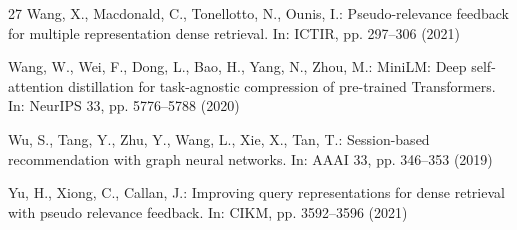 \documentclass[runningheads]{llncs}
\begin{document}
\begin{thebibliography}{27}
Wang, X., Macdonald, C., Tonellotto, N., Ounis, I.:
Pseudo-relevance feedback for multiple representation dense retrieval.
In: ICTIR, pp. 297--306 (2021)

Wang, W., Wei, F., Dong, L., Bao, H., Yang, N., Zhou, M.:
MiniLM: Deep self-attention distillation for task-agnostic compression of
pre-trained Transformers. In: NeurIPS 33, pp. 5776--5788 (2020)

Wu, S., Tang, Y., Zhu, Y., Wang, L., Xie, X., Tan, T.:
Session-based recommendation with graph neural networks.
In: AAAI 33, pp. 346--353 (2019)

Yu, H., Xiong, C., Callan, J.:
Improving query representations for dense retrieval with pseudo relevance
feedback. In: CIKM, pp. 3592--3596 (2021)

\end{thebibliography}
\end{document}
